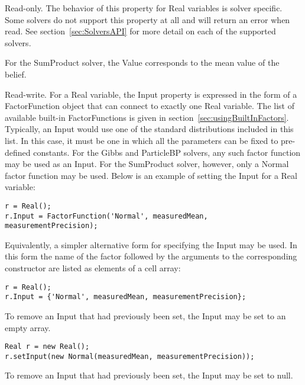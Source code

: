 
Read-only.  The behavior of this property for Real variables is solver specific.  Some solvers do not support this property at all and will return an error when read.  See section~\ref{sec:SolversAPI} for more detail on each of the supported solvers.

For the SumProduct solver, the Value corresponds to the mean value of the belief.



Read-write.  For a Real variable, the Input property is expressed in the form of a FactorFunction object that can connect to exactly one Real variable.  The list of available built-in FactorFunctions is given in section~\ref{sec:usingBuiltInFactors}.  Typically, an Input would use one of the standard distributions included in this list.  In this case, it must be one in which all the parameters can be fixed to pre-defined constants.  For the Gibbs and ParticleBP solvers, any such factor function may be used as an Input.  For the SumProduct solver, however, only a Normal factor function may be used.  Below is an example of setting the Input for a Real variable:

\ifmatlab

\begin{lstlisting}
r = Real();
r.Input = FactorFunction('Normal', measuredMean, measurementPrecision);
\end{lstlisting}

Equivalently, a simpler alternative form for specifying the Input may be used.  In this form the name of the factor followed by the arguments to the corresponding constructor are listed as elements of a cell array:

\begin{lstlisting}
r = Real();
r.Input = {'Normal', measuredMean, measurementPrecision};
\end{lstlisting}

To remove an Input that had previously been set, the Input may be set to an empty array.

\fi

\ifjava

\begin{lstlisting}
Real r = new Real();
r.setInput(new Normal(measuredMean, measurementPrecision));
\end{lstlisting}

To remove an Input that had previously been set, the Input may be set to null.

\fi

